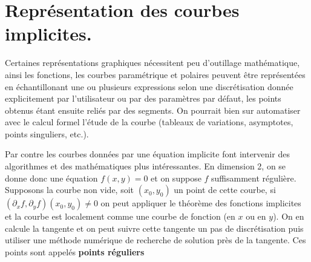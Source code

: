 \documentclass[a4paper,11pt]{article}
\begin{document}
\section{Repr\'esentation des courbes implicites.} \label{sec:implicite}
Certaines repr\'esentations graphiques n\'ecessitent peu d'outillage
math\'ematique, ainsi les fonctions, les courbes param\'etrique
et polaires peuvent \^etre repr\'esent\'ees en \'echantillonant 
une ou plusieurs expressions
selon une discr\'etisation donn\'ee explicitement par l'utilisateur
ou par des param\`etres par d\'efaut, les points obtenus
\'etant ensuite reli\'es par des segments.
On pourrait bien sur automatiser avec le calcul
formel l'\'etude de la courbe (tableaux de variations,
asymptotes, points singuliers, etc.).

Par contre les courbes donn\'ees par une \'equation implicite
font intervenir des algorithmes et des math\'ematiques
plus int\'eressantes. En dimension 2, on se donne donc
une \'equation $f(x,y)=0$ et on suppose $f$ suffisamment
r\'eguli\`ere. Supposons la courbe non vide, soit $(x_0,y_0)$
un point de cette courbe, si $(\partial_x f,\partial_y f)(x_0,y_0) \neq
0$ on peut appliquer le th\'eor\`eme des fonctions implicites
et la courbe est localement comme une courbe de fonction (en $x$ ou
en $y$). On en calcule la tangente et on peut suivre cette tangente
un pas de discr\'etisation puis utiliser une m\'ethode num\'erique
de recherche de solution pr\`es de la tangente. Ces points
sont appel\'es {\bf points r\'eguliers}
\end{document}
